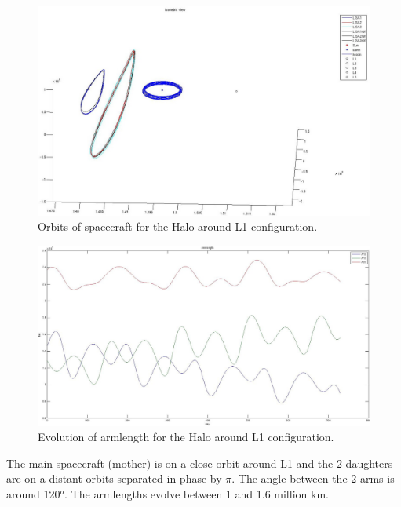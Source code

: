 \documentclass{iopart}
\begin{document}
\begin{figure}[H]
\begin{center}
\includegraphics[width=\textwidth]{FigNoiseOrbSens/HL1isometric}
\end{center}
\caption{Orbits of spacecraft for the Halo around L1 configuration.
\label{F:HL1Orb} } 
\end{figure}

\begin{figure}[H]
\begin{center}
\includegraphics[width=\textwidth]{FigNoiseOrbSens/HL1armlength}
\end{center}
\caption{Evolution of armlength for the Halo around L1 configuration.
\label{F:HL1Arm} } 
\end{figure}



The main spacecraft (mother) is on a close orbit around L1 and the 2 daughters are on a distant orbits separated in phase by  $\pi$.
The angle between the 2 arms is around 120$^o$. The armlengths evolve between 1 and 1.6 million km.
\end{document}
